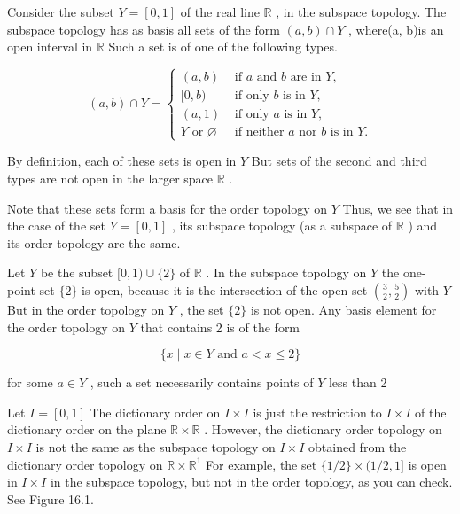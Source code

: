 \begin{example} Consider the subset \(Y = \left\lbrack  {0,1}\right\rbrack\) of the real line \(\mathbb{R}\) , in the subspace topology. The subspace topology has as basis all sets of the form \(\left( {a,b}\right)  \cap  Y\) , where(a, b)is an open interval in \(\mathbb{R}\) Such a set is of one of the following types.

\[
\left( {a,b}\right)  \cap  Y = \left\{ \begin{array}{ll} \left( {a,b}\right) & \text{ if }a\text{ and }b\text{ are in }Y, \\  \lbrack 0,b) & \text{ if only }b\text{ is in }Y, \\  \left( {a,1}\right) & \text{ if only }a\text{ is in }Y, \\  Y\text{ or }\varnothing & \text{ if neither }a\text{ nor }b\text{ is in }Y. \end{array}\right.
\]

By definition, each of these sets is open in \(Y\) But sets of the second and third types are not open in the larger space \(\mathbb{R}\) .

Note that these sets form a basis for the order topology on \(Y\) Thus, we see that in the case of the set \(Y = \left\lbrack  {0,1}\right\rbrack\) , its subspace topology (as a subspace of \(\mathbb{R}\) ) and its order topology are the same.
\end{example}

\begin{example} Let \(Y\) be the subset \(\lbrack 0,1) \cup  \{ 2\}\) of \(\mathbb{R}\) . In the subspace topology on \(Y\) the one-point set \(\{ 2\}\) is open, because it is the intersection of the open set \(\left( {\frac{3}{2},\frac{5}{2}}\right)\) with \(Y\) But in the order topology on \(Y\) , the set \(\{ 2\}\) is not open. Any basis element for the order topology on \(Y\) that contains 2 is of the form

\[
\{ x \mid  x \in  Y\text{ and }a < x \leq  2\}
\]

for some \(a \in  Y\) , such a set necessarily contains points of \(Y\) less than 2
\end{example}

\begin{example} Let \(I = \left\lbrack  {0,1}\right\rbrack\) The dictionary order on \(I \times  I\) is just the restriction to \(I \times  I\) of the dictionary order on the plane \(\mathbb{R} \times  \mathbb{R}\) . However, the dictionary order topology on \(I \times  I\) is not the same as the subspace topology on \(I \times  I\) obtained from the dictionary order topology on \(\mathbb{R} \times  {\mathbb{R}}^{1}\) For example, the set \(\{ 1/2\}  \times  (1/2,1\rbrack\) is open in \(I \times  I\) in the subspace topology, but not in the order topology, as you can check. See Figure 16.1.
\end{example}


